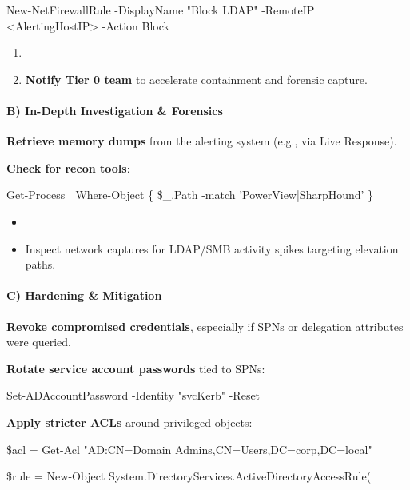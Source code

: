 {{New-NetFirewallRule -DisplayName "Block LDAP" -RemoteIP <AlertingHostIP> -Action Block

\begin{enumerate}
    \item 

    \item \textbf{Notify Tier 0 team} to accelerate containment and forensic capture.

\end{enumerate}

\paragraph{\textbf{   B) In-Depth Investigation \& Forensics}}

\textbf{Retrieve memory dumps} from the alerting system (e.g., via Live Response).

\textbf{Check for recon tools}:

  

 

Get-Process | Where-Object \{ \$_.Path -match 'PowerView|SharpHound' \}

\begin{itemize}
    \item 

    \item Inspect network captures for LDAP/SMB activity spikes targeting elevation paths.

\end{itemize}

\paragraph{\textbf{   C) Hardening \& Mitigation}}

\textbf{Revoke compromised credentials}, especially if SPNs or delegation attributes were queried.

\textbf{Rotate service account passwords} tied to SPNs:

  

 

Set-ADAccountPassword -Identity "svcKerb" -Reset

\textbf{Apply stricter ACLs} around privileged objects:

  

 

\$acl = Get-Acl "AD:CN=Domain Admins,CN=Users,DC=corp,DC=local"

\$rule = New-Object System.DirectoryServices.ActiveDirectoryAccessRule(

}}
